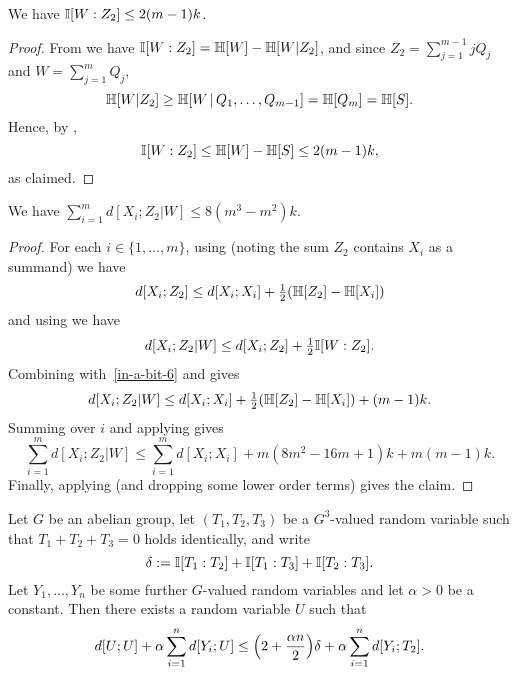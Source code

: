 \begin{lemma}\label{mutual-w-z2}\leanok  We have  $\mathbb{I}[W : Z_2] \leq 2 (m-1) k$.
\end{lemma}

\begin{proof}
  From  we have $\mathbb{I}[W : Z_2] = \mathbb{H}[W] - \mathbb{H}[W | Z_2]$, and since $Z_2 = \sum_{j=1}^{m-1} j Q_j$ and $W = \sum_{j=1}^m Q_j$,
  \[
    \mathbb{H}[W | Z_2] \geq \mathbb{H}[W \,|\, Q_1,\dots,Q_{m-1}] = \mathbb{H}[Q_m] = \mathbb{H}[S].
  \]
  Hence, by ,
  \[
    \mathbb{I}[W : Z_2] \leq \mathbb{H}[W] - \mathbb{H}[S] \leq 2 (m-1) k,
  \]
  as claimed.
\end{proof}

\begin{lemma}\label{xi-z2-w-dist}\leanok We have $\sum_{i=1}^m d[X_i;Z_2|W] \leq 8(m^3-m^2) k$.
\end{lemma}

\begin{proof}
  For each $i \in \{1,\dots, m\}$, using  (noting the sum $Z_2$ contains $X_i$ as a summand) we have
  \begin{equation}\label{in-a-bit-6}
    d[X_i;Z_2] \leq d[X_i;X_i] + \tfrac12 (\mathbb{H}[Z_2] - \mathbb{H}[X_i])
  \end{equation}
  and using  we have
  \[
    d[X_i;Z_2 | W] \leq d[X_i;Z_2] + \tfrac12 \mathbb{I}[W : Z_2].
  \]
 Combining with~\eqref{in-a-bit-6} and  gives
 \[ d[X_i;Z_2 | W] \leq d[X_i;X_i] + \tfrac12 (\mathbb{H}[Z_2] - \mathbb{H}[X_i]) + (m-1)k.\]
 Summing over $i$ and applying  gives
 \[ \sum_{i = 1}^m d[X_i;Z_2 | W] \leq \sum_{i = 1}^m d[X_i;X_i] + m(8m^2-16m+1) k + m(m-1) k.\]
Finally, applying  (and dropping some lower order terms) gives the claim.
\end{proof}

\begin{lemma}
  \label{lem:get-better}\leanok
  Let $G$ be an abelian group, let $(T_1,T_2,T_3)$ be a $G^3$-valued random variable such that $T_1+T_2+T_3=0$ holds identically, and write
  \[
    \delta := \mathbb{I}[T_1 : T_2] + \mathbb{I}[T_1 : T_3] + \mathbb{I}[T_2 : T_3].
  \]
  Let $Y_1,\dots,Y_n$ be some further $G$-valued random variables and let $\alpha>0$ be a constant.
  Then there exists a random variable $U$ such that
  \begin{equation}
    \label{eq:get-better}
    d[U;U] + \alpha \sum_{i=1}^n d[Y_i;U] \leq \Bigl(2 + \frac{\alpha n}{2} \Bigr) \delta + \alpha \sum_{i=1}^n d[Y_i;T_2].
  \end{equation}
\end{lemma}

